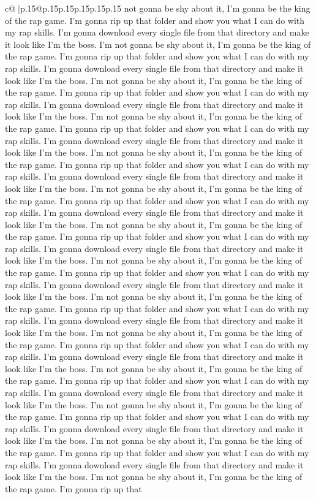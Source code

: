 \documentclass{article}
\begin{document}
{\begin{supertabular}{c@{$\;$}|p{.15\linewidth}@{}p{.15\linewidth}p{.15\linewidth}p{.15\linewidth}p{.15\linewidth}p{.15\linewidth}}
{{{not gonna be shy about it, I'm gonna be the king of the rap game. I'm gonna rip up that folder and show you what I can do with my rap skills. I'm gonna download every single file from that directory and make it look like I'm the boss. I'm not gonna be shy about it, I'm gonna be the king of the rap game. I'm gonna rip up that folder and show you what I can do with my rap skills. I'm gonna download every single file from that directory and make it look like I'm the boss. I'm not gonna be shy about it, I'm gonna be the king of the rap game. I'm gonna rip up that folder and show you what I can do with my rap skills. I'm gonna download every single file from that directory and make it look like I'm the boss. I'm not gonna be shy about it, I'm gonna be the king of the rap game. I'm gonna rip up that folder and show you what I can do with my rap skills. I'm gonna download every single file from that directory and make it look like I'm the boss. I'm not gonna be shy about it, I'm gonna be the king of the rap game. I'm gonna rip up that folder and show you what I can do with my rap skills. I'm gonna download every single file from that directory and make it look like I'm the boss. I'm not gonna be shy about it, I'm gonna be the king of the rap game. I'm gonna rip up that folder and show you what I can do with my rap skills. I'm gonna download every single file from that directory and make it look like I'm the boss. I'm not gonna be shy about it, I'm gonna be the king of the rap game. I'm gonna rip up that folder and show you what I can do with my rap skills. I'm gonna download every single file from that directory and make it look like I'm the boss. I'm not gonna be shy about it, I'm gonna be the king of the rap game. I'm gonna rip up that folder and show you what I can do with my rap skills. I'm gonna download every single file from that directory and make it look like I'm the boss. I'm not gonna be shy about it, I'm gonna be the king of the rap game. I'm gonna rip up that folder and show you what I can do with my rap skills. I'm gonna download every single file from that directory and make it look like I'm the boss. I'm not gonna be shy about it, I'm gonna be the king of the rap game. I'm gonna rip up that folder and show you what I can do with my rap skills. I'm gonna download every single file from that directory and make it look like I'm the boss. I'm not gonna be shy about it, I'm gonna be the king of the rap game. I'm gonna rip up that folder and show you what I can do with my rap skills. I'm gonna download every single file from that directory and make it look like I'm the boss. I'm not gonna be shy about it, I'm gonna be the king of the rap game. I'm gonna rip up that folder and show you what I can do with my rap skills. I'm gonna download every single file from that directory and make it look like I'm the boss. I'm not gonna be shy about it, I'm gonna be the king of the rap game. I'm gonna rip up that folder and show you what I can do with my rap skills. I'm gonna download every single file from that directory and make it look like I'm the boss. I'm not gonna be shy about it, I'm gonna be the king of the rap game. I'm gonna rip up that }}}
\end{supertabular}}
\end{document}
